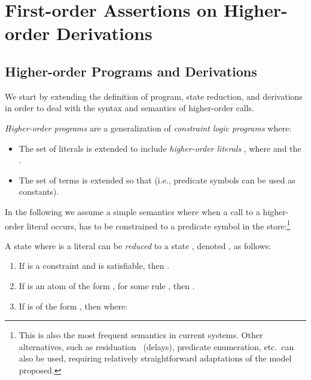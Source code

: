 \documentclass{llncs}
\begin{document}
\section{First-order Assertions on Higher-order Derivations}
\label{sec:fo-ho}



\subsection{Higher-order Programs and Derivations}

We start by extending the definition of program, state reduction,
and derivations in order to deal with the syntax and semantics of
higher-order calls.
 
\begin{definition}
\emph{Higher-order programs} are a generalization of
  \emph{constraint logic programs} where:
  \begin{itemize}
  \item The set of literals  is extended to include
    \emph{higher-order literals} , where  and the .
  \item The set of terms  is extended so that 
    (i.e., predicate symbols  can be used as constants).
  \end{itemize}
\end{definition}
In the following we assume a simple semantics where when a call to a
higher-order literal  occurs,  has to be
constrained to a predicate symbol in the store:\footnote{This is also
  the most frequent semantics in current systems. Other alternatives,
  such as residuation~\cite{HASSAN93} (delays), predicate enumeration,
  etc.\ can also be used, requiring relatively straightforward
  adaptations of the model proposed.}

\begin{definition}
  \label{def:ho-reductions}
  A state  where  is a literal can be
  \emph{reduced} to a state , denoted , as
  follows:
  \begin{enumerate}
  \item 
    If  is a constraint and  is satisfiable,
    then .
  \item 
    If  is an atom of the form , for some
    rule  , then .
  \item If  is of the form , then 
     where:
    
  \end{enumerate}
\end{definition}
\end{document}
